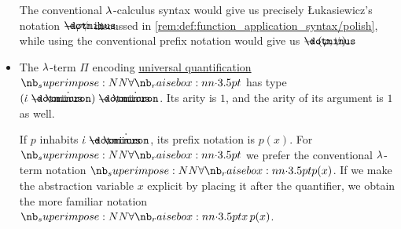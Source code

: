 \begin{remark}
\begin{itemize}
    The conventional \( {\mathrm \lambda} \)-calculus syntax would give us precisely \L{}ukasiewicz's notation \( {\synimplies} \varphi \psi \) discussed in \ref{rem:def:function_application_syntax/polish}, while using the conventional prefix notation would give us \( \synimplies(\varphi, \psi) \).

    \item The \( {\mathrm \lambda} \)-term \( \Pi \) encoding \hyperref[def:predicate_logic_alphabet/quantifiers/universal]{universal quantification} \( \synforall \) has type \( (\syn\iota \synimplies \syn\omicron) \synimplies \syn\omicron \). Its arity is \( 1 \), and the arity of its argument is \( 1 \) as well.

    If \( p \) inhabits \( \syn\iota \synimplies \syn\omicron \), its prefix notation is \( p(x) \). For \( \synforall \) we prefer the conventional \( {\mathrm \lambda} \)-term notation \( \synforall p(x) \). If we make the abstraction variable \( x \) explicit by placing it after the quantifier, we obtain the more familiar notation \( \qforall x p(x) \).
  \end{itemize}
\end{remark}

